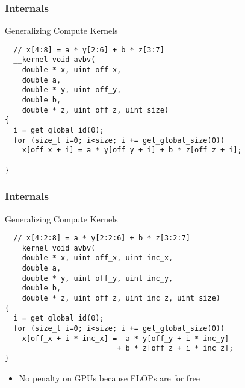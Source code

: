 \begin{frame}[fragile]
\frametitle{Internals}

 \begin{block}{Generalizing Compute Kernels}
  \begin{lstlisting}
  // x[4:8] = a * y[2:6] + b * z[3:7]
  __kernel void avbv(
    double * x, uint off_x,
    double a,
    double * y, uint off_y,
    double b,
    double * z, uint off_z, uint size)
{
  i = get_global_id(0);
  for (size_t i=0; i<size; i += get_global_size(0))
    x[off_x + i] = a * y[off_y + i] + b * z[off_z + i]; 

}
  \end{lstlisting}
 \end{block}

 \vspace*{1.5cm}
\end{frame}



\begin{frame}[fragile]
\frametitle{Internals}

 \begin{block}{Generalizing Compute Kernels}
  \begin{lstlisting}
  // x[4:2:8] = a * y[2:2:6] + b * z[3:2:7]
  __kernel void avbv(
    double * x, uint off_x, uint inc_x,
    double a,
    double * y, uint off_y, uint inc_y,
    double b,
    double * z, uint off_z, uint inc_z, uint size)
{
  i = get_global_id(0);
  for (size_t i=0; i<size; i += get_global_size(0))
    x[off_x + i * inc_x] =  a * y[off_y + i * inc_y]
                          + b * z[off_z + i * inc_z]; 
}
  \end{lstlisting}
 \end{block}

  \begin{block}{}
   \begin{itemize}
    \item No penalty on GPUs because FLOPs are for free
   \end{itemize}
  \end{block}

\end{frame}


